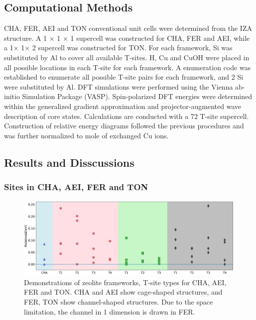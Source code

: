 \documentclass[12pt]{article}
\begin{document}
\subsection*{Computational Methods}

CHA, FER, AEI and TON conventional unit cells were determined from the IZA structure. A 1 $\times$ 1 $\times$ 1 supercell was constructed for CHA, FER and AEI, while a 1$\times$ 1$\times$ 2 supercell was constructed for TON. For each framework, Si was  substituted by Al to cover all available T-sites. H, Cu and CuOH were placed in all possible locations in each T-site for each framework. A enumeration code was established to enumerate all possible T-site pairs for each framework, and 2 Si were substituted by Al. DFT simulations were performed using the Vienna ab-initio Simulation Package (VASP). Spin-polarized DFT energies were determined within the generalized gradient approximation and projector-augmented wave description of core states. Calculations are conducted with a 72 T-site supercell. Construction of relative energy diagrams followed the previous procedures \cite{Paolucci2016} and was further normalized to mole of exchanged Cu ions.


\subsection*{Results and Disscussions}
\subsubsection*{Sites in CHA, AEI, FER and TON}
\begin{figure}[H]
\centering
 \includegraphics[width=6in]{./Figures/Figure-1}
 \caption{Demonstrations of zeolite frameworks, T-site types for CHA, AEI, FER and TON. CHA and AEI show cage-shaped structures, and FER, TON show channel-shaped structures. Due to the space limitation, the channel in 1 dimension is drawn in FER.}
 \label{Topologies}
\end{figure}
\end{document}
